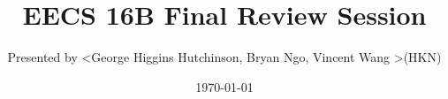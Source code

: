 

\title{EECS 16B Final Review Session}
\author{Presented by \textless George Higgins Hutchinson, Bryan Ngo, Vincent Wang \textgreater (HKN)}
\date{\today}

\newcommand{\SlideAccessingLogistics}{@2229}
















